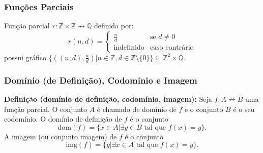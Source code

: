 \begin{frame}
  \frametitle{Funções Parciais}


  \vspace{0.5cm}

  Função parcial \( r : \mathbb{Z} \times \mathbb{Z} \nrightarrow \mathbb{Q} \) definida por:
  \[
  r(n, d) = 
  \begin{cases} 
    \frac{n}{d} & \text{se } d \neq 0 \\
    \text{indefinido} & \text{caso contrário}
  \end{cases}
  \]
  possui gráfico \( \{((n, d), \frac{n}{d}) | n \in \mathbb{Z}, d \in \mathbb{Z} \setminus \{0\}\} \subseteq \mathbb{Z}^2 \times \mathbb{Q} \).

\end{frame}

\begin{frame}
  \frametitle{Domínio (de Definição), Codomínio e Imagem}

  \textbf{Definição (domínio de definição, codomínio, imagem):}
  Seja \( f : A \nrightarrow B \) uma função parcial.
  O conjunto \( A \) é chamado de domínio de \( f \) e o conjunto \( B \) é o seu codomínio.
  O domínio de definição de \( f \) é o conjunto
  \[
  \text{dom}(f) = \{x \in A | \exists y \in B \text{ tal que } f(x) = y\}.
  \]
  A imagem (ou conjunto imagem) de \( f \) é o conjunto
  \[
  \text{img}(f) = \{y | \exists x \in A \text{ tal que } f(x) = y\}.
  \]

  \begin{columns}
    \begin{column}{0.5\textwidth}
      \centering
    \end{column}


\end{columns}
\end{frame}
